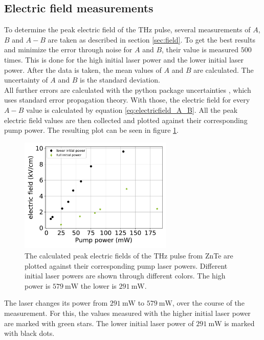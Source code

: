\subsection{Electric field measurements}
\label{sec:znte_electricfield}
To determine the peak electric field of the $\si{\tera\hertz}$ pulse, several measurements of $A$, $B$ and $A-B$ are taken as described in section \ref{sec:field}.
To get the best results and minimize the error through noise for $A$ and $B$, their value is measured $500$ times.
This is done for the high initial laser power and the lower initial laser power.
After the data is taken, the mean values of $A$ and $B$ are calculated.
The uncertainty of $A$ and $B$ is the standard deviation.
\\
All further errors are calculated with the python package uncertainties \cite{uncertainties}, which uses standard error propagation theory.
With those, the electric field for every $A-B$ value is calculated by equation \eqref{eq:electricfield_A_B}.
All the peak electric field values are then collected and plotted against their corresponding pump power.
The resulting plot can be seen in figure \ref{fig:znte_electricfield}.\FloatBarrier
\begin{figure}
    \centering
    \includegraphics[width=0.65\textwidth]{Plots/eltric_field_ZnTe.pdf}
    \caption{The calculated peak electric fields of the $\si{\tera\hertz}$ pulse from ZnTe are plotted against their corresponding pump laser powers.
    Different initial laser powers are shown through different colors. The high power is $\SI{579}{\milli\W}$ the lower is $\SI{291}{\milli\W}$.}
    \label{fig:znte_electricfield}
\end{figure}\FloatBarrier
The laser changes its power from $\SI{291}{\milli\W}$ to $\SI{579}{\milli\W}$, over the course of the measurement. 
For this, the values measured with the higher initial laser power are marked with green stars.
The lower initial laser power of $\SI{291}{\milli\W}$ is marked with black dots.

